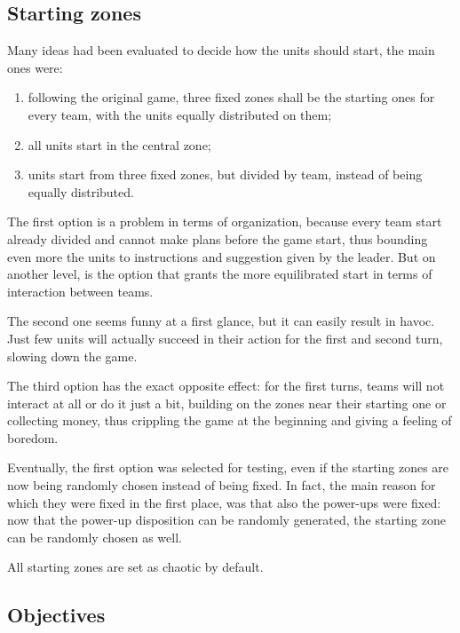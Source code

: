 		\subsection{Starting zones}
			
			Many ideas had been evaluated to decide how the units should start, the main ones were: 
			
			\begin{enumerate}
				\item following the original game, three fixed zones shall be the starting ones for every team, with the units equally distributed on them;
				\item all units start in the central zone;
				\item units start from three fixed zones, but divided by team, instead of being equally distributed.
			\end{enumerate}
			
			The first option is a problem in terms of organization, because every team start already divided and cannot make plans before the game start, thus bounding even more the units to instructions and suggestion given by the leader.
			But on another level, is the option that grants the more equilibrated start in terms of interaction between teams.
			
			The second one seems funny at a first glance, but it can easily result in havoc. Just few units will actually succeed in their action for the first and second turn, slowing down the game.
			
			The third option has the exact opposite effect: for the first turns, teams will not interact at all or do it just a bit, building on the zones near their starting one or collecting money, thus crippling the game at the beginning and giving a feeling of boredom. 
			
			Eventually, the first option was selected for testing, even if the starting zones are now being randomly chosen instead of being fixed.
			In fact, the main reason for which they were fixed in the first place, was that also the power-ups were fixed: now that the power-up disposition can be randomly generated, the starting zone can be randomly chosen as well.
			
			All starting zones are set as chaotic by default.
		
		\subsection{Objectives}
			
